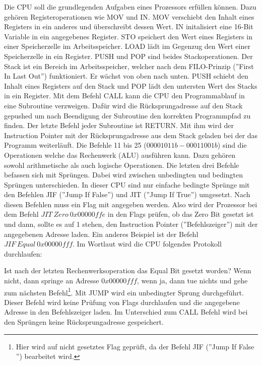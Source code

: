 \documentclass[a4paper,12pt]{article}
\begin{document}
\newpage
\noindent Die CPU soll die grundlegenden Aufgaben eines Prozessors erfüllen können. Dazu gehören Registeroperationen wie MOV und IN. MOV verschiebt den Inhalt eines Registers in ein anderes und überschreibt dessen Wert. IN initalisiert eine 16-Bit Variable in ein angegebenes Register. STO speichert den Wert eines Registers in einer Speicherzelle im Arbeitsspeicher. LOAD lädt im Gegenzug den Wert einer Speicherzelle in ein Register. PUSH und POP sind beides Stackoperationen. Der Stack ist ein Bereich im Arbeitsspeicher, welcher nach dem FILO-Prinzip (''First In Last Out'') funktioniert. Er wächst von oben nach unten. PUSH schiebt den Inhalt eines Registers auf den Stack und POP lädt den untersten Wert des Stacks in ein Register. Mit dem Befehl CALL kann die CPU den Programmablauf in eine Subroutine verzweigen. Dafür wird die Rücksprungadresse auf den Stack gepushed um nach Beendigung der Subroutine den korrekten Programmpfad zu finden. Der letzte Befehl jeder Subroutine ist RETURN. Mit ihm wird der Instruction Pointer mit der Rücksprungadresse aus dem Stack geladen bei der das Programm weiterläuft. Die Befehle 11 bis 25 ($00001011b - 00011001b$) sind die Operationen welche das Rechenwerk (ALU) ausführen kann. Dazu gehören sowohl arithmetische als auch logische Operationen. Die letzten drei Befehle befassen sich mit Sprüngen. Dabei wird zwischen unbedingten und bedingten Sprüngen unterschieden. In dieser CPU sind nur einfache bedingte Sprünge mit den Befehlen JIF (''Jump If False'') und JIT (''Jump If True'') umgesetzt. Nach diesen Befehlen muss ein Flag mit angegeben werden. Also wird der Prozessor bei dem Befehl $JIT \ Zero \ 0x00000ffe$  in den Flags prüfen, ob das Zero Bit gesetzt ist und dann, sollte es auf 1 stehen, den Instruction Pointer (''Befehlszeiger'') mit der angegebenen Adresse laden. Ein anderes Beispiel ist der Befehl $JIF \ Equal \ 0x00000fff$. Im Wortlaut wird die CPU folgendes Protokoll durchlaufen:\par\smallskip\noindent Ist nach der letzten Rechenwerksoperation das Equal Bit gesetzt worden? Wenn nicht, dann springe an Adresse $0x00000fff$, wenn ja, dann tue nichts und gehe zum nächsten Befehl\footnote{Hier wird auf nicht gesetztes Flag geprüft, da der Befehl JIF (''Jump If False '') bearbeitet wird.}. Mit JUMP wird ein unbedingter Sprung durchgeführt. Dieser Befehl wird keine Prüfung von Flags durchlaufen und die angegebene Adresse in den Befehlszeiger laden. Im Unterschied zum CALL Befehl wird bei den Sprüngen keine Rücksprungadresse gespeichert.
\end{document}
